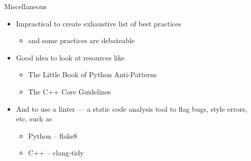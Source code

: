 \begin{frame}{Miscellaneous}
    \pause
    \begin{itemize}[<+->]
        \item Impractical to create exhaustive list of best practices
              \begin{itemize}[<+->]
                  \item and some practices are debateable
              \end{itemize}
        \item Good idea to look at resources like
              \begin{itemize}[<+->]
                  \item The Little Book of Python Anti-Patterns
                  \item The C++ Core Guidelines
              \end{itemize}
        \item And to use a \alert{linter} --- a static code analysis tool to flag bugs, style errors, etc, such as
              \begin{itemize}[<+->]
                  \item Python -- flake8
                  \item C++ -- clang-tidy
              \end{itemize}
    \end{itemize}
\end{frame}

